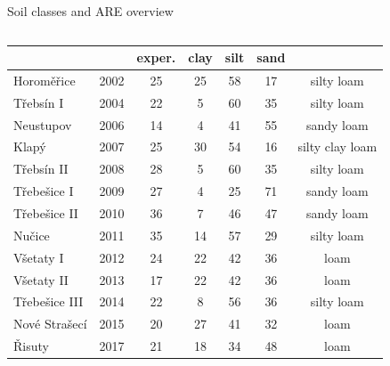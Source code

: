 \begin{block}{Soil classes and ARE overview}
\begin{columns}
\begin{column}{0.6\textwidth}
{\begin{table}[]
\begin{tabular}{lcccccc}
                            &         & exper.       & clay  & silt  & sand &  \\
                \hline
                Horoměřice    & 2002    & 25                & 25             & 58            & 17            & silty loam      \\
                Třebsín I     & 2004    & 22                & 5              & 60            & 35            & silty loam      \\
                Neustupov     & 2006    & 14                & 4              & 41            & 55            & sandy loam      \\
                Klapý         & 2007    & 25                & 30             & 54            & 16            & silty clay loam \\
                Třebsín II    & 2008    & 28                & 5              & 60            & 35            & silty loam      \\
                Třebešice I   & 2009    & 27                & 4              & 25            & 71            & sandy loam      \\
                Třebešice II  & 2010    & 36                & 7              & 46            & 47            & sandy loam      \\
                Nučice        & 2011    & 35                & 14             & 57            & 29            & silty loam      \\
                Všetaty I     & 2012    & 24                & 22             & 42            & 36            & loam            \\
                Všetaty II    & 2013    & 17                & 22             & 42            & 36            & loam            \\
                Třebešice III & 2014    & 22                & 8              & 56            & 36            & silty loam      \\
                Nové Strašecí & 2015    & 20                & 27             & 41            & 32            & loam            \\
                Řisuty        & 2017    & 21                & 18             & 34            & 48            & loam           \\
                \hline
                \hline
                \end{tabular}
            \end{table}
            }
        \end{column}
    \end{columns}
\end{block}


